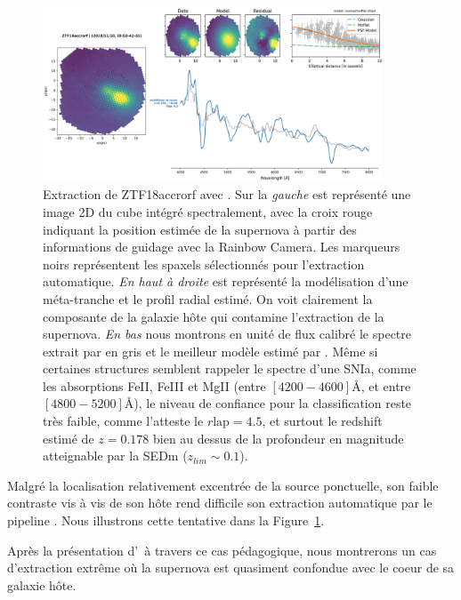 \documentclass[../main/main.tex]{subfiles}
\begin{document}
\begin{figure}[ht]
  \centering
  \includegraphics[width=0.9\textwidth]{../figures/04_hypergal/easycaseextractionpysedm.png}
  \caption[Extraction de ZTF18accrorf avec \pysedm]{Extraction de
    ZTF18accrorf avec \pysedm. Sur la \textit{gauche} est représenté une image 2D
  du cube intégré spectralement, avec la croix rouge indiquant la
  position estimée de la supernova à partir des informations de
    guidage avec la Rainbow Camera. Les marqueurs noirs représentent les
  spaxels sélectionnés pour l'extraction automatique. \textit{En haut à
    droite} est représenté la modélisation d'une méta-tranche et le
  profil radial estimé. On voit clairement la composante de la galaxie
  hôte qui contamine l'extraction de la supernova. \textit{En bas} nous
  montrons en unité de flux calibré le spectre extrait par \pysedm en gris et le
meilleur modèle estimé par . Même si certaines structures
semblent rappeler le spectre d'une SNIa, comme les absorptions FeII,
FeIII et MgII (entre $[4200-4600]$\AA, et entre $[4800-5200]$\AA), le
niveau de confiance pour la classification reste très faible, comme
l'atteste le $r\text{lap}=4.5$, et surtout le redshift estimé de
$z=0.178$ bien au dessus de la profondeur en magnitude atteignable par
la SEDm ($z_{lim}\sim0.1$).  }
  \label{fig:easycaseextractionpysedm}
\end{figure}


Malgré la localisation relativement excentrée de la source ponctuelle,
son faible contraste vis à vis de son hôte rend difficile son extraction
automatique par le pipeline \pysedm. Nous illustrons cette tentative
dans la Figure~\ref{fig:easycaseextractionpysedm}.

Après la présentation d'\hypergal\ à travers ce cas pédagogique, nous
montrerons un cas d'extraction extrême où la supernova est quasiment
confondue avec le coeur de sa galaxie hôte.


%
%
\end{document}
